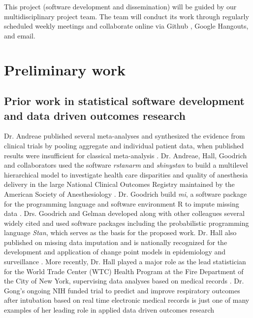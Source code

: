 \documentclass[11pt,notitlepage]{article}
\begin{document}
This project (software development and dissemination) will be guided by 
our multidisciplinary project team. The team will conduct its work through 
regularly scheduled weekly meetings and collaborate online via 
Github \cite{Chacon2009ProGit}, Google Hangouts, and email. 

\section*{Preliminary work}

\subsection*{Prior work in statistical software development and data driven outcomes research} 
Dr. Andreae published several meta-analyses and synthesized the evidence 
from clinical trials by pooling aggregate and individual patient data, when 
published results were insufficient for classical meta-analysis 
\cite{AndreaeJohnsonAbstract2013, Andreae2013, Andreae2015, Carter2015, Atchabahian2015}. Dr. Andreae, Hall, Goodrich and 
collaborators used the software \textit{rstanarm} and \textit{shinystan} to build a multilevel 
hierarchical model to investigate health care disparities and quality of 
anesthesia delivery in the large National Clinical Outcomes Registry maintained 
by the American Society of Anesthesiology \cite{AndreaeWhite2015}. Dr. Goodrich 
build \textit{mi}, a software package for the programming language and 
software environment R to impute missing data \cite{miCRAN}. Drs. Goodrich 
and Gelman developed along with other colleagues several widely cited and used software packages 
including the probabilistic programming language \textit{Stan}\cite{Stan_Software_2014}, 
which serves as the basis for the proposed work. Dr. Hall also published on missing data 
imputation \cite{Hall2009a, Wang_20029935, Wang_20029935} and is nationally 
recognized for the development and application of change point models in 
epidemiology and surveillance 
\cite{Hall2000, Hall2001, Hall2003bayesian, Hall2009, Hall2015}. 
More recently, Dr. Hall played a major role as the lead statistician 
for the World Trade Center (WTC) Health Program at the Fire Department 
of the City of New York, supervising data analyses based on medical 
records \cite{Aldrich2010, Hall2015, Zeig-Owens2011}.  
Dr. Gong's ongoing NIH funded trial to predict and improve 
respiratory outcomes after intubation based on real time 
electronic medical records is just one of many examples of her 
leading role in applied data driven outcomes research 
\end{document}
